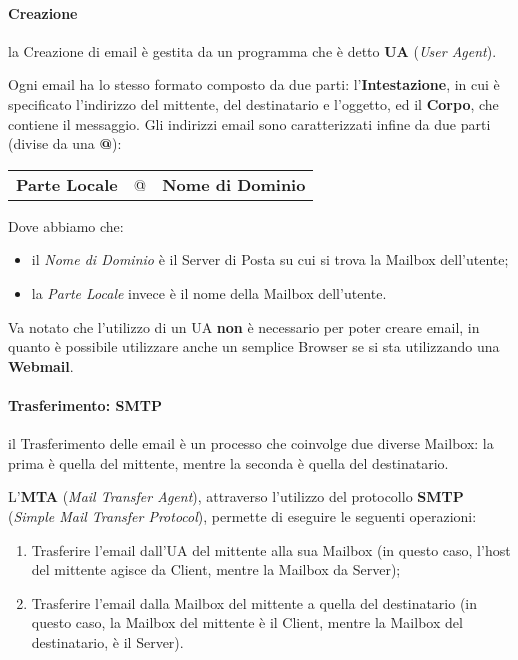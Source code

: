\documentclass[a4paper]{article}
\begin{document}
				
				\paragraph{Creazione} 
					la Creazione di email è gestita da un programma che è detto \textbf{UA} (\emph{User Agent}). 
					
					Ogni email ha lo stesso formato composto da due parti: l'\textbf{Intestazione}, in cui è specificato l'indirizzo del mittente, del destinatario e l'oggetto, ed il \textbf{Corpo}, che contiene il messaggio.
					Gli indirizzi email sono caratterizzati infine da due parti (divise da una \textbf{@}):\\
					\begin{center}
						\begin{tabular}{ccc}
							\textbf{Parte Locale} & @ & \textbf{Nome di Dominio}\\
						\end{tabular}
					\end{center}
					Dove abbiamo che:
					\begin{itemize}
						\item il \emph{Nome di Dominio} è il Server di Posta su cui si trova la Mailbox dell'utente;
						\item la \emph{Parte Locale} invece è il nome della Mailbox dell'utente.
					\end{itemize}
					
					Va notato che l'utilizzo di un UA \textbf{non} è necessario per poter creare email, in quanto è possibile utilizzare anche un semplice Browser se si sta utilizzando una \textbf{Webmail}.
				
				
				\paragraph{Trasferimento: SMTP}
					il Trasferimento delle email è un processo che coinvolge due diverse Mailbox: la prima è quella del mittente, mentre la seconda è quella del destinatario.
					
					L'\textbf{MTA} (\emph{Mail Transfer Agent}), attraverso l'utilizzo del protocollo \textbf{SMTP} (\emph{Simple Mail Transfer Protocol}), permette di eseguire le seguenti operazioni:
					\begin{enumerate}
						\item Trasferire l'email dall'UA del mittente alla sua Mailbox (in questo caso, l'host del mittente agisce da Client, mentre la Mailbox da Server);
						\item Trasferire l'email dalla Mailbox del mittente a quella del destinatario (in questo caso, la Mailbox del mittente è il Client, mentre la Mailbox del destinatario, è il Server).
					\end{enumerate}
						
\end{document}
